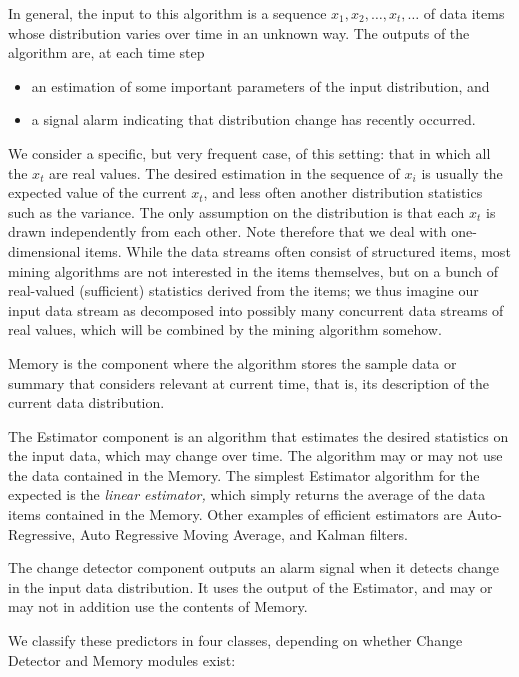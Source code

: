 In general, the input to this algorithm is a sequence 
$x_1, x_2, \ldots, x_t, \ldots$ of data items whose distribution varies
over time in an unknown way. The outputs of the algorithm are, 
at each time step

\begin{itemize}
\item an estimation of some important parameters of the input distribution, and
\item a signal alarm indicating that distribution change has recently occurred.
\end{itemize}

We consider a specific, but very frequent case, of this setting: that in which 
all the $x_t$ are real values. 
The desired estimation in the sequence of $x_i$ is usually the expected value of the 
current $x_t$, and less often another distribution statistics such as the variance. 
The only assumption on the distribution is that each $x_t$ is drawn independently from each other.
Note therefore that we deal with one-dimensional items. 
While the data streams often consist of structured items, most
mining algorithms are not interested in the items themselves, but on
a bunch of real-valued (sufficient) statistics derived from the items; we thus imagine
our input data stream as decomposed into possibly many concurrent data streams 
of real values, which will be combined by the mining algorithm somehow. 

Memory is the component where the algorithm stores the sample data or summary that considers
relevant at current time, that is, its description of the current data distribution. 

The Estimator component is an algorithm that estimates the desired statistics on the input data, which
may change over time. The algorithm may or may not use the data contained in the Memory. 
The simplest Estimator algorithm for the expected is the {\em linear estimator,}
which simply returns the average of the data items contained in the Memory. 
Other examples of efficient estimators are 
Auto-Regressive, Auto Regressive Moving Average, and Kalman filters. 

The change detector component outputs an alarm signal when it detects change in the input data distribution. 
It uses the output of the Estimator, and may or may not in addition use the contents of Memory. 

We classify these predictors in four classes, depending on whether 
Change Detector and Memory modules exist:

